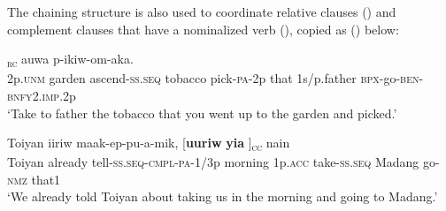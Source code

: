 The chaining structure is also used to coordinate relative clauses () and complement clauses that have a nominalized verb (), copied as () below: 

\ea%
\label{ex:x1463}
\textsubscript{\textsc{rc}}  auwa  p-ikiw-om-aka.\\
2p.\textsc{unm} garden ascend-\textsc{ss}.\textsc{seq} tobacco  pick-\textsc{pa}-2p that 1s/p.father \textsc{\textsc{bp}x}-go-\textsc{ben}-\textsc{bnfy}2.\textsc{imp}.2p\\
\glt`Take to father the tobacco that you went up to the garden and picked.'
\z


\ea%
\label{ex:x1848}
\gll Toiyan  iiriw  maak-ep-pu-a-mik, [\textbf{uuriw} \textbf{yia}    ]\textsubscript{\textsc{cc}} nain\\
Toiyan  already  tell-\textsc{ss}.\textsc{seq}-\textsc{cmpl}-\textsc{pa}-1/3p morning 1p.\textsc{acc} take-\textsc{ss}.\textsc{seq} Madang go-\textsc{nmz} that1\\
\glt`We already told Toiyan about taking us in the morning and going to Madang.' 
\z